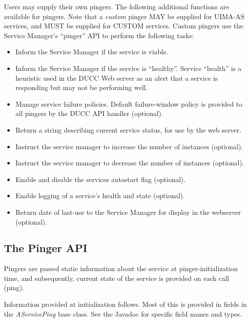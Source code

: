       Users may supply their own pingers.  The following additional functions are available for
      pingers.  Note that a {\em custom} pinger MAY be supplied for UIMA-AS services, and
      MUST be supplied for CUSTOM services.  Custom pingers use the Service Manager's
      ``pinger'' API to perform the following tasks:
      \begin{itemize}
        \item Inform the Service Manager if the service is viable.
        \item Inform the Service Manager if the service is ``healthy''.  Service ``health''
          is a heuristic used in the DUCC Web server as an alert that a service 
          is responding but may
          not be performing well.
        \item Manage service failure policies. Default failure-window policy is
          provided to all pingers by the DUCC API handler (optional).
        \item Return a string describing current service status, for use by the
          web server.
        \item Instruct the service manager to increase the number of instances (optional).
        \item Instruct the service manager to decrease the number of instances (optional).
        \item Enable and disable the services autostart flag (optional).
        \item Enable logging of a service's health and state (optional).
        \item Return date of last-use to the Service Manager for display in the
          webserver (optional).
      \end{itemize}

      \subsection{The Pinger API}

      Pingers are passed static information about the service at pinger-initialization
      time, and subsequently, current state of the service is provided on each call (ping).

      Information provided at initialization follows.  Most of this is
      provided in fields in the {\em AServicePing} base class.  See the Javadoc for 
      specific field names and types.

